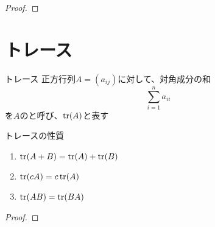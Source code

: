 \documentclass[../../../topic_linear-map]{subfiles}
\begin{document}
\begin{proof}
\end{proof}

\sectionline
\section{トレース}

\begin{definition}{トレース}
  正方行列$A=(a_{ij})$に対して、対角成分の和
  \begin{equation*}
    \sum_{i=1}^n a_{ii}
  \end{equation*}
  を$A$のと呼び、$\tr(A)$と表す
\end{definition}

\begin{theorem}{トレースの性質}
  \begin{enumerate}[label=\romanlabel]
    \item $\tr(A+B) = \tr(A) + \tr(B)$
    \item $\tr(cA) = c\tr(A)$
    \item $\tr(AB) = \tr(BA)$
  \end{enumerate}
\end{theorem}

\begin{proof}
\end{proof}
\end{document}
